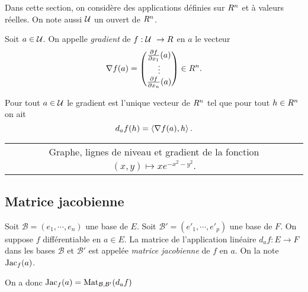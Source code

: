 Dans cette section, on considère des applications définies sur $R^n$  et à valeurs réelles. On note aussi $\mathcal{U}$ un ouvert de $R^n$.

\begin{definition}
    Soit $a\in\mathcal{U}$. On appelle \emph{gradient} de $f: \U \to \R$ en $a$ le vecteur 
    \[
        \nabla f (a) = \begin{pmatrix}
            \frac{\partial f}{\partial x_1}(a) \\
            \vdots\\
            \frac{\partial f}{\partial x_n}(a)

        \end{pmatrix} \in R^n.
    \]
\end{definition}

\begin{proposition}
    Pour tout $a\in\mathcal{U}$ le gradient est l'unique vecteur de $R^n$ tel que pour tout $h\in R^n$ on ait 
    \[
        d_a f(h) = \left\langle \nabla f(a) , h\right\rangle.
    \]
\end{proposition}


\begin{center}
    \begin{tabular}{c}
        
        Graphe, lignes de niveau et gradient de la fonction $(x,y) \mapsto x e^{-x^2 - y^2}$.
    \end{tabular}
\end{center}

\begin{remark}
    \pl{\rep{5cm}}	
\end{remark}


\sld{\vfill\pagebreak[5]}%
\subsection{Matrice jacobienne}

\begin{definition}
    Soit $\mathcal B=(e_1,\cdots,e_n)$ une base de $E$. Soit $\mathcal B'=(e'_1,\cdots,e'_p)$ une base de $F$. On suppose $f$ différentiable en $a\in E$. La matrice de l'application linéaire $d_a f:E\to F$ dans les bases $\mathcal B$ et $\mathcal B'$ est appelée \emph{matrice jacobienne} de $f$ en $a$. On la note $\operatorname{Jac}_f (a)$.
\end{definition}

\begin{remark}
    On a donc $\operatorname{Jac}_f(a) = \operatorname{Mat}_{\mathcal B,\mathcal B'} (d_a f)$
\end{remark}

